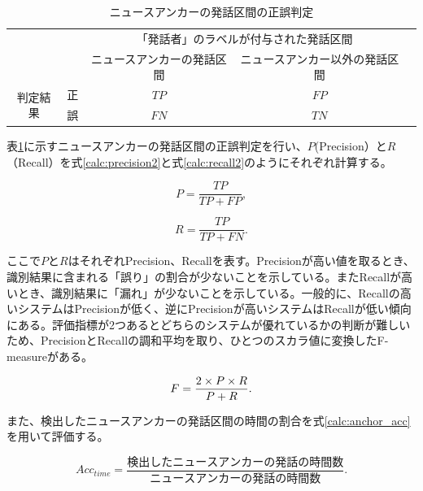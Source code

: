 \begin{table}[H]
\begin{center}
    \caption{ニュースアンカーの発話区間の正誤判定 \label{table:clustering}}
\begin{tabular}{|c|c|c|c|l}
\cline{1-4}
\multicolumn{2}{|c|}{\multirow{2}{*}{}} & \multicolumn{2}{c|}{「発話者」のラベルが付与された発話区間} &  \\ \cline{3-4}
\multicolumn{2}{|c|}{}                  & ニュースアンカーの発話区間        & ニュースアンカー以外の発話区間        &  \\ \cline{1-4}
\multirow{2}{*}{判定結果}        & 正        & $TP$                  & $FP$                   &  \\ \cline{2-4}
& 誤        & $FN$                  & $TN$                   &  \\ \cline{1-4}
\end{tabular}
\end{center}
\end{table}

表\ref{table:clustering}に示すニュースアンカーの発話区間の正誤判定を行い、$P$(Precision）と$R$（Recall）を式\ref{calc:precision2}と式\ref{calc:recall2}のようにそれぞれ計算する。

\begin{equation}
\label{calc:precision2}
P = \frac{TP}{TP + FP},
\end{equation}

\begin{equation}
\label{calc:recall2}
R = \frac{TP}{TP + FN}.
\end{equation}

ここで$P$と$R$はそれぞれPrecision、Recallを表す。Precisionが高い値を取るとき、識別結果に含まれる「誤り」の割合が少ないことを示している。またRecallが高いとき、識別結果に「漏れ」が少ないことを示している。一般的に、Recallの高いシステムはPrecisionが低く、逆にPrecisionが高いシステムはRecallが低い傾向にある。評価指標が2つあるとどちらのシステムが優れているかの判断が難しいため、PrecisionとRecallの調和平均を取り、ひとつのスカラ値に変換したF-measureがある。

\begin{equation}
\label{calc:fmeasure}
F = \frac{2 \times P \times R}{P + R}. \notag
\end{equation}

また、検出したニュースアンカーの発話区間の時間の割合を式\ref{calc:anchor_acc}を用いて評価する。

\begin{equation}
\label{calc:anchor_acc}
Acc_{time} = \frac{検出したニュースアンカーの発話の時間数}{ニュースアンカーの発話の時間数}.
\end{equation}

